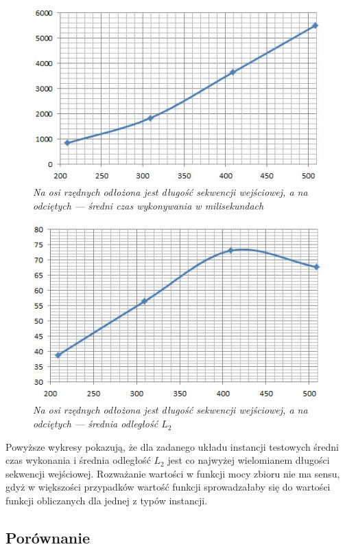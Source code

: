 \documentclass{article}
\begin{document}
\begin{figure}[h]
\center
\includegraphics[scale=1]{Przechwytywanie5.jpg}
\caption{\textit{Na osi rzędnych odłożona jest długość sekwencji wejściowej, a na odciętych --- średni czas wykonywania w milisekundach}}
\end{figure}

\begin{figure}[h]
\center
\includegraphics[scale=1]{Przechwytywanie6.jpg}
\caption{\textit{Na osi rzędnych odłożona jest długość sekwencji wejściowej, a na odciętych --- średnia odległość $L_2$}}
\end{figure}

Powyższe wykresy pokazują, że dla zadanego układu instancji testowych średni czas wykonania i średnia odległość $L_2$ jest co najwyżej wielomianem długości sekwencji wejściowej.
Rozważanie wartości w funkcji mocy zbioru nie ma sensu, gdyż w większości przypadków wartość funkcji sprowadzałaby się do wartości funkcji obliczanych dla jednej z typów instancji.

\subsection{Porównanie}
\end{document}
